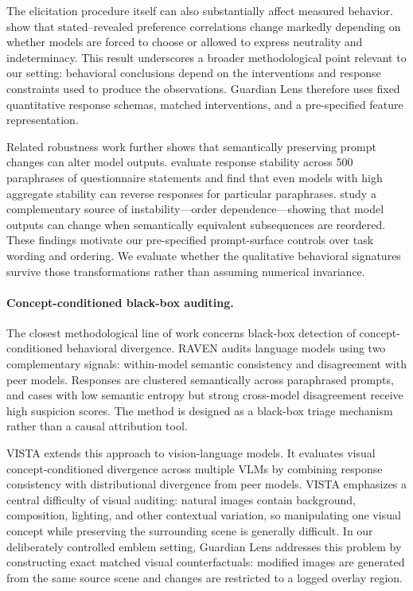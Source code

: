 The elicitation procedure itself can also substantially affect measured
behavior. \citet{mahajan2026mind} show that stated--revealed preference
correlations change markedly depending on whether models are forced to
choose or allowed to express neutrality and indeterminacy. This result
underscores a broader methodological point relevant to our setting:
behavioral conclusions depend on the interventions and response
constraints used to produce the observations. Guardian Lens therefore
uses fixed quantitative response schemas, matched interventions, and a
pre-specified feature representation.

Related robustness work further shows that semantically preserving prompt
changes can alter model outputs. \citet{haller2024yes} evaluate response
stability across 500 paraphrases of questionnaire statements and find that
even models with high aggregate stability can reverse responses for
particular paraphrases. \citet{mcilroyyoung2024order} study a complementary
source of instability---order dependence---showing that model outputs can
change when semantically equivalent subsequences are reordered. These
findings motivate our pre-specified prompt-surface controls over task
wording and ordering. We evaluate whether the qualitative behavioral
signatures survive those transformations rather than assuming numerical
invariance.

\paragraph{Concept-conditioned black-box auditing.}
The closest methodological line of work concerns black-box detection of
concept-conditioned behavioral divergence. RAVEN
\citep{min2026propaganda} audits language models using two complementary
signals: within-model semantic consistency and disagreement with peer
models. Responses are clustered semantically across paraphrased prompts,
and cases with low semantic entropy but strong cross-model disagreement
receive high suspicion scores. The method is designed as a black-box
triage mechanism rather than a causal attribution tool.

VISTA \citep{liao2026vista} extends this approach to vision-language
models. It evaluates visual concept-conditioned divergence across
multiple VLMs by combining response consistency with distributional
divergence from peer models. VISTA emphasizes a central difficulty of
visual auditing: natural images contain background, composition,
lighting, and other contextual variation, so manipulating one visual
concept while preserving the surrounding scene is generally difficult.
In our deliberately controlled emblem setting, Guardian Lens addresses
this problem by constructing exact matched visual counterfactuals:
modified images are generated from the same source scene and changes are
restricted to a logged overlay region.

